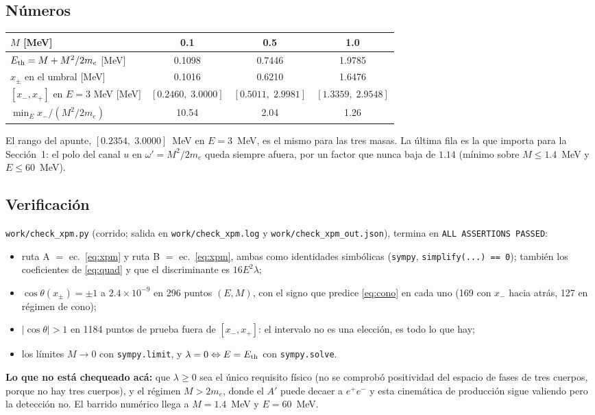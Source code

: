 \documentclass[11pt,a4paper]{article}
\newcommand{\Ap}{A'}
\newcommand{\wpr}{\omega'}
\begin{document}
\subsection{Números}
\begin{center}\small
\begin{tabular}{@{}lccc@{}}
\toprule
$M$ [MeV] & 0.1 & 0.5 & 1.0\\
\midrule
$E_{\rm th}=M+M^2/2m_e$ [MeV] & 0.1098 & 0.7446 & 1.9785\\
$x_\pm$ en el umbral [MeV] & 0.1016 & 0.6210 & 1.6476\\
$[x_-,x_+]$ en $E=3$ MeV [MeV] & $[0.2460,\;3.0000]$ & $[0.5011,\;2.9981]$ & $[1.3359,\;2.9548]$\\
$\min_E x_-/(M^2/2m_e)$ & 10.54 & 2.04 & 1.26\\
\bottomrule
\end{tabular}
\end{center}
\noindent El rango del apunte, $[0.2354,\;3.0000]$~MeV en $E=3$~MeV, es el mismo para las tres masas. La última fila
es la que importa para la Sección~1: el polo del canal $u$ en $\wpr=M^2/2m_e$ queda siempre afuera, por un factor que
nunca baja de $1.14$ (mínimo sobre $M\le1.4$~MeV y $E\le60$~MeV).

\subsection{Verificación}
\texttt{work/check\_xpm.py} (corrido; salida en \texttt{work/check\_xpm.log} y
\texttt{work/check\_xpm\_out.json}), termina en \texttt{ALL ASSERTIONS PASSED}:
\begin{itemize}\itemsep2pt
\item ruta A $=$ ec.~\eqref{eq:xpm} y ruta B $=$ ec.~\eqref{eq:xpm}, ambas como identidades simbólicas
(\texttt{sympy}, \texttt{simplify(...) == 0}); también los coeficientes de \eqref{eq:quad} y que el discriminante es
$16E^2\lambda$;
\item $\cos\theta(x_\pm)=\pm1$ a $2.4\times10^{-9}$ en 296 puntos $(E,M)$, con el signo que predice
\eqref{eq:cono} en cada uno (169 con $x_-$ hacia atrás, 127 en régimen de cono);
\item $|\cos\theta|>1$ en 1184 puntos de prueba fuera de $[x_-,x_+]$: el intervalo no es una elección, es todo lo que
hay;
\item los límites $M\to0$ con \texttt{sympy.limit}, y $\lambda=0\Leftrightarrow E=E_{\rm th}$ con \texttt{sympy.solve}.
\end{itemize}
\noindent \textbf{Lo que no está chequeado acá:} que $\lambda\ge0$ sea el único requisito físico (no se comprobó
positividad del espacio de fases de tres cuerpos, porque no hay tres cuerpos), y el régimen $M>2m_e$, donde el $\Ap$
puede decaer a $e^+e^-$ y esta cinemática de producción sigue valiendo pero la detección no. El barrido numérico llega
a $M=1.4$~MeV y $E=60$~MeV.
\end{document}
